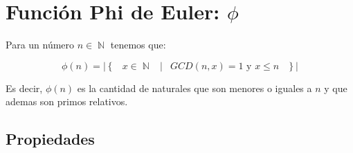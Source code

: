 \documentclass[12pt, fleqn]{report}                             %
\DeclareMathOperator \Space {\quad}                             %
\DeclareMathOperator \MiniSpace {\;}                            %
\newcommand \Such {\MiniSpace|\MiniSpace}                       %
\newcommand{\Set}[1]{\left\{ \MiniSpace #1 \MiniSpace \right\}} %
\DeclareMathOperator \Naturals  {\mathbb{N}}                     %
\begin{document}
    \clearpage
    \section{Función Phi de Euler: $\phi$ }

        Para un número $n \in \Naturals$ tenemos que:

        \begin{equation}
            \phi(n) = 
                \big|
                    \Set{ x \in \Naturals \Such GCD(n, x) = 1 \text{ y } x \leq n }
                \big|
        \end{equation}
 
        Es decir, $\phi(n)$ es la cantidad de naturales que son menores o iguales a
        $n$ y que ademas son primos relativos.


        \clearpage
        \subsection{Propiedades}
\end{document}

